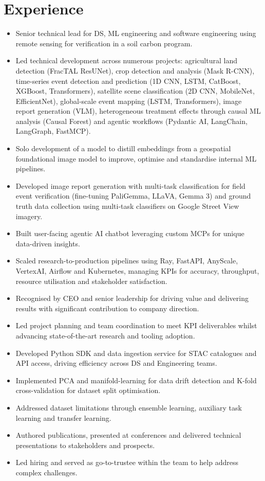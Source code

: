 \documentclass[9pt]{extarticle} %
\begin{document}


\section{Experience}

\begin{itemize}
    \itemsep -0.4em
    \item Senior technical lead for DS, ML engineering and software engineering using remote sensing for verification in a soil carbon program.
    \item Led technical development across numerous projects: agricultural land detection (FracTAL ResUNet), crop detection and analysis (Mask R-CNN), time-series event detection and prediction (1D CNN, LSTM, CatBoost, XGBoost, Transformers), satellite scene classification (2D CNN, MobileNet, EfficientNet), global-scale event mapping (LSTM, Transformers), image report generation (VLM), heterogeneous treatment effects through causal ML analysis (Causal Forest) and agentic workflows (Pydantic AI, LangChain, LangGraph, FastMCP).
    \item Solo development of a model to distill embeddings from a geospatial foundational image model to improve, optimise and standardise internal ML pipelines.
    \item Developed image report generation with multi-task classification for field event verification (fine-tuning PaliGemma, LLaVA, Gemma 3) and ground truth data collection using multi-task classifiers on Google Street View imagery.
    \item Built user-facing agentic AI chatbot leveraging custom MCPs for unique data-driven insights.
    \item Scaled research-to-production pipelines using Ray, FastAPI, AnyScale, VertexAI, Airflow and Kubernetes, managing KPIs for accuracy, throughput, resource utilisation and stakeholder satisfaction.
    \item Recognised by CEO and senior leadership for driving value and delivering results with significant contribution to company direction.
    \item Led project planning and team coordination to meet KPI deliverables whilst advancing state-of-the-art research and tooling adoption.
    \item Developed Python SDK and data ingestion service for STAC catalogues and API access, driving efficiency across DS and Engineering teams.
    \item Implemented PCA and manifold-learning for data drift detection and K-fold cross-validation for dataset split optimisation.
    \item Addressed dataset limitations through ensemble learning, auxiliary task learning and transfer learning.
    \item Authored publications, presented at conferences and delivered technical presentations to stakeholders and prospects.
    \item Led hiring and served as go-to-trustee within the team to help address complex challenges.
\end{itemize}
\end{document}
